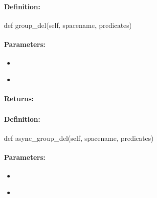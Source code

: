 \paragraph{Definition:}
\begin{pythoncode}
def group_del(self, spacename, predicates)
\end{pythoncode}

\paragraph{Parameters:}
\begin{itemize}[noitemsep]
\item {}\\

\item {}\\

\end{itemize}

\paragraph{Returns:}


\pagebreak
\subsubsection{}
\label{api:python:async_group_del}


\paragraph{Definition:}
\begin{pythoncode}
def async_group_del(self, spacename, predicates)
\end{pythoncode}

\paragraph{Parameters:}
\begin{itemize}[noitemsep]
\item {}\\

\item {}\\

\end{itemize}

